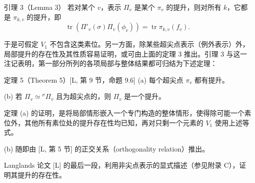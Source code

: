 \begin{originaltheorem}{引理 3（Lemma 3）}
若对某个 $v$，表示 $\Pi_v$ 是某个 $\pi_v$ 的提升，则对所有 $k$，它都是 $\pi_{k,v}$ 的提升，即
\[
 \operatorname{tr}(\Pi'_v(\sigma)\Pi_v(\phi_v))
 =\operatorname{tr}\pi_{k,v}(f_v).
\]
\end{originaltheorem}

于是可假定 $V_1$ 不包含这类素位。另一方面，除某些超尖点表示（例外表示）外，局部提升的存在性及其性质容易证明，或可由上面的定理 3 推出。引理 3 与这一注记表明，第一部分所列的各项局部与整体结果都可归结为下述定理：

\begin{originaltheorem}{定理 5（Theorem 5）[L, 第 9 节，命题 9.6]}
(a) 每个超尖点 $\pi_v$ 都有提升。

(b) 若 $\Pi_v\simeq{}^\sigma\Pi_v$ 且为超尖点的，则 $\Pi_v$ 是一个提升。
\end{originaltheorem}

定理 (a) 的证明，是将局部情形嵌入一个专门构造的整体情形，使得除可能一个素位外，其他所有素位处的提升存在性均已知，再对只剩一个元素的 $V_1$ 使用上述等式。

(b) 随即由 [L, 第 5 节] 的正交关系（orthogonality relation）推出。

Langlands 论文 [L] 的最后一段，利用非尖点表示的显式描述（参见附录 C），证明其提升的存在性。


